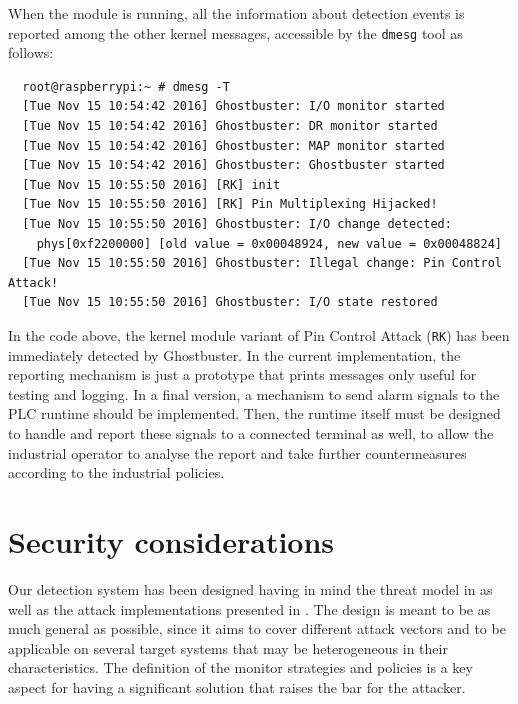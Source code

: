 When the module is running, all the information about detection events is reported among the other kernel messages, accessible by the \verb|dmesg| tool as follows:
\begin{Verbatim}
  root@raspberrypi:~ # dmesg -T
  [Tue Nov 15 10:54:42 2016] Ghostbuster: I/O monitor started
  [Tue Nov 15 10:54:42 2016] Ghostbuster: DR monitor started
  [Tue Nov 15 10:54:42 2016] Ghostbuster: MAP monitor started
  [Tue Nov 15 10:54:42 2016] Ghostbuster: Ghostbuster started
  [Tue Nov 15 10:55:50 2016] [RK] init
  [Tue Nov 15 10:55:50 2016] [RK] Pin Multiplexing Hijacked!
  [Tue Nov 15 10:55:50 2016] Ghostbuster: I/O change detected:
	phys[0xf2200000] [old value = 0x00048924, new value = 0x00048824]
  [Tue Nov 15 10:55:50 2016] Ghostbuster: Illegal change: Pin Control Attack!
  [Tue Nov 15 10:55:50 2016] Ghostbuster: I/O state restored
\end{Verbatim}
In the code above, the kernel module variant of Pin Control Attack (\verb|RK|) has been immediately detected by Ghostbuster.
In the current implementation, the reporting mechanism is just a prototype that prints messages only useful for testing and logging.
In a final version, a mechanism to send alarm signals to the PLC runtime should be implemented.
Then, the runtime itself must be designed to handle and report these signals to a connected terminal as well,
to allow the industrial operator to analyse the report and take further countermeasures according to the industrial policies.


\section{Security considerations}
\label{sec:def_sec}

Our detection system has been designed having in mind the threat model in  as well as the attack implementations presented in .
The design is meant to be as much general as possible, since it aims to cover different attack vectors and to be applicable
on several target systems that may be heterogeneous in their characteristics.
The definition of the monitor strategies and policies is a key aspect for having a significant solution that raises the bar for the attacker.

